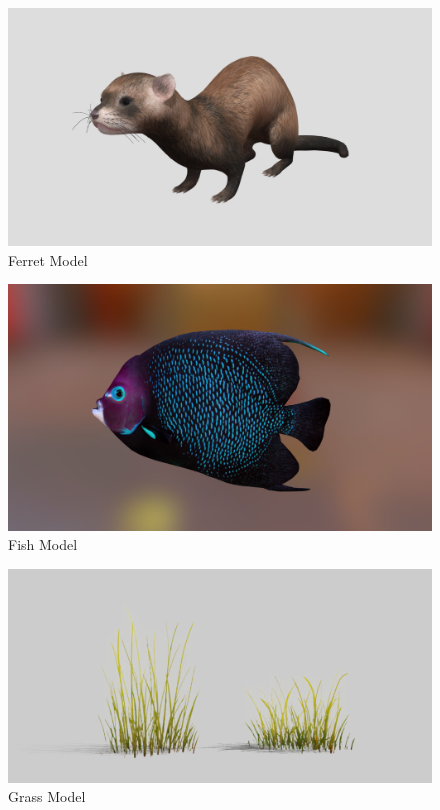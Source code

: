 \documentclass{article}
\begin{document}
    \begin{figure}
        \centering
        \includegraphics[width=\textwidth]{images/models/ferret.png}
        \caption{Ferret Model \cite{model-ferret}} \label{fig:ferret-model}
    \end{figure}
    \begin{figure}
        \centering
        \includegraphics[width=\textwidth]{images/models/fish.png}
        \caption{Fish Model \cite{model-fish}} \label{fig:fish-model}
    \end{figure}
    \begin{figure}
        \centering
        \includegraphics[width=\textwidth]{images/models/grass.png}
        \caption{Grass Model \cite{model-grass}} \label{fig:grass-model}
    \end{figure}
\end{document}
